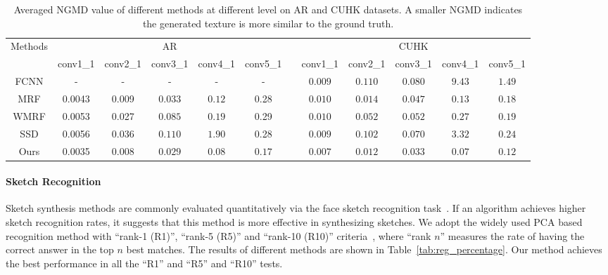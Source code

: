 \documentclass[10pt,twocolumn,letterpaper]{article}
\begin{document}
\begin{table}[htbp]
\caption{Averaged NGMD value of different methods at different level on AR and CUHK datasets. A smaller NGMD indicates the generated texture is more similar to the ground truth.}
\label{tab:NGMD}
\begin{center}
{\small
\begin{tabular}{ccccccccccccc}
\hline
\multicolumn{2}{c|}{\multirow {2}{*}{Methods}} &\multicolumn{5}{c}{AR} & & \multicolumn{5}{c}{CUHK} \\
\cline{3-7} \cline{9-13} \multicolumn{2}{c|}{} & conv1\_1 & conv2\_1 & conv3\_1 & conv4\_1 & conv5\_1 & &
 conv1\_1 & conv2\_1 & conv3\_1 & conv4\_1 & conv5\_1  \\
\hline
\multicolumn{2}{c|}{FCNN} & - & - & - & - & - & & { $0.009$} &{ $0.110$} & {$0.080$} & {$9.43$} & {$1.49$}  \\
\multicolumn{2}{c|}{MRF} & 0.0043 & 0.009 & {$0.033$}  & {$0.12$} & 0.28 & & { $0.010$} &{ $0.014$} & {$0.047$} & $0.13$ & $0.18$  \\
\multicolumn{2}{c|}{WMRF} & 0.0053 & 0.027 & {$0.085$}  & {$0.19$} & 0.29 & & { $0.010$} &{ $0.052$} & {$0.052$} & {$0.27$} & {$0.19$}  \\
\multicolumn{2}{c|}{SSD} & 0.0056 & 0.036 & {$0.110$} & {$1.90$} & 0.28 & & { $0.009$} &{ $0.102$} & {$0.070$} & {$3.32$} & {$0.24$}  \\
\multicolumn{2}{c|}{Ours} & {\color{red} 0.0035} & {\color{red} 0.008} & {\color{red} $0.029$} & {\color{red} $0.08$} & {\color{red} $0.17$} & & {\color{red}$0.007$} &{\color{red} $0.012$} & {\color{red} $0.033$} & {\color{red} $0.07$} & {\color{red} $0.12$}  \\
\hline
\end{tabular}
}
\end{center}
\end{table}

\paragraph*{Sketch Recognition} Sketch synthesis methods are commonly evaluated quantitatively  via the face sketch recognition task~\cite{song2014real,wang2009face,zhang2015end,zhou2012markov}. If an algorithm achieves higher sketch recognition rates, it suggests that this method is more effective in synthesizing sketches. We adopt the widely used PCA based recognition method with ``rank-1 (R1)'', ``rank-5 (R5)'' and ``rank-10 (R10)'' criteria~\cite{wang2009face}, where ``rank $n$'' measures the rate of having the correct answer in the top $n$ best matches. The results of different methods are shown in Table~\ref{tab:reg_percentage}. Our method achieves the best performance in all the ``R1'' and ``R5'' and ``R10'' tests. 
\end{document}

